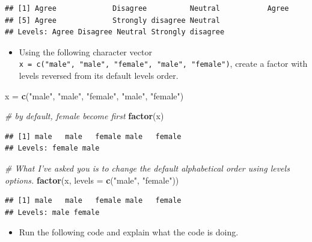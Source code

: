 \documentclass[]{book}
\newenvironment{Shaded}{\begin{snugshade}}{\end{snugshade}}
\newcommand{\CommentTok}[1]{\textcolor[rgb]{0.56,0.35,0.01}{\textit{#1}}}
\newcommand{\DataTypeTok}[1]{\textcolor[rgb]{0.13,0.29,0.53}{#1}}
\newcommand{\KeywordTok}[1]{\textcolor[rgb]{0.13,0.29,0.53}{\textbf{#1}}}
\newcommand{\NormalTok}[1]{#1}
\newcommand{\StringTok}[1]{\textcolor[rgb]{0.31,0.60,0.02}{#1}}
\providecommand{\tightlist}{%
  \setlength{\itemsep}{0pt}\setlength{\parskip}{0pt}}
\begin{document}
\begin{verbatim}
## [1] Agree             Disagree          Neutral           Agree            
## [5] Agree             Strongly disagree Neutral          
## Levels: Agree Disagree Neutral Strongly disagree
\end{verbatim}

\begin{itemize}
\tightlist
\item
  Using the following character vector \texttt{x\ =\ c("male",\ "male",\ "female",\ "male",\ "female")}, create a factor with levels reversed from its default levels order.
\end{itemize}

\begin{Shaded}
\begin{Highlighting}[]
\NormalTok{x =}\StringTok{ }\KeywordTok{c}\NormalTok{(}\StringTok{"male"}\NormalTok{, }\StringTok{"male"}\NormalTok{, }\StringTok{"female"}\NormalTok{, }\StringTok{"male"}\NormalTok{, }\StringTok{"female"}\NormalTok{)}
\end{Highlighting}
\end{Shaded}

\begin{Shaded}
\begin{Highlighting}[]
\CommentTok{# by default, female become first}
\KeywordTok{factor}\NormalTok{(x)}
\end{Highlighting}
\end{Shaded}

\begin{verbatim}
## [1] male   male   female male   female
## Levels: female male
\end{verbatim}

\begin{Shaded}
\begin{Highlighting}[]
\CommentTok{# What I've asked you is to change the default alphabetical order using levels options. }
\KeywordTok{factor}\NormalTok{(x, }\DataTypeTok{levels =} \KeywordTok{c}\NormalTok{(}\StringTok{"male"}\NormalTok{, }\StringTok{"female"}\NormalTok{))}
\end{Highlighting}
\end{Shaded}

\begin{verbatim}
## [1] male   male   female male   female
## Levels: male female
\end{verbatim}

\begin{itemize}
\tightlist
\item
  Run the following code and explain what the code is doing.
\end{itemize}
\end{document}
